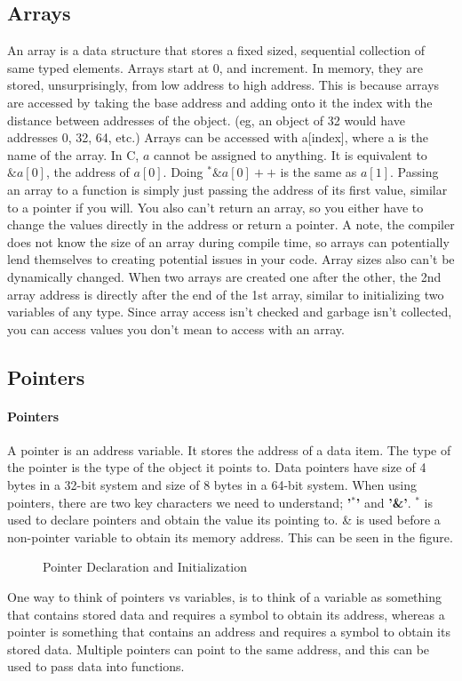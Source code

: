 \subsection{Arrays}
An array is a data structure that stores a fixed sized, sequential collection of same typed elements. Arrays start at 0, and increment. In memory, they are stored, unsurprisingly, from low address to high address. This is because arrays are accessed by taking the base address and adding onto it the index with the distance between addresses of the object. (eg, an object of 32 would have addresses 0, 32, 64, etc.) \newline
Arrays can be accessed with a[index], where a is the name of the array. In C, $a$ cannot be assigned to anything. It is equivalent to $\&a[0]$, the address of $a[0]$. Doing $^*\&a[0]++$ is the same as $a[1]$. Passing an array to a function is simply just passing the address of its first value, similar to a pointer if you will. You also can't return an array, so you either have to change the values directly in the address or return a pointer. 
\newline A note, the compiler does not know the size of an array during compile time, so arrays can potentially lend themselves to creating potential issues in your code. Array sizes also can't be dynamically changed. When two arrays are created one after the other, the 2nd array address is directly after the end of the 1st array, similar to initializing two variables of any type. Since array access isn't checked and garbage isn't collected, you can access values you don't mean to access with an array.
\subsection{Pointers}
\paragraph{Pointers} A pointer is an address variable. It stores the address of a data item. The type of the pointer is the type of the object it points to. Data pointers have size of 4 bytes in a 32-bit system and size of 8 bytes in a 64-bit system. When using pointers, there are two key characters we need to understand; \textbf{'$^*$'} and \textbf{'\&'}. $^*$ is used to declare pointers and obtain the value its pointing to. \& is used before a non-pointer variable to obtain its memory address. This can be seen in the figure.
\begin{figure}[!htb]
	\caption{\label{fig:pointers} Pointer Declaration and Initialization}
\end{figure}
\newline
One way to think of pointers vs variables, is to think of a variable as something that contains stored data and requires a symbol to obtain its address, whereas a pointer is something that contains an address and requires a symbol to obtain its stored data. Multiple pointers can point to the same address, and this can be used to pass data into functions.
